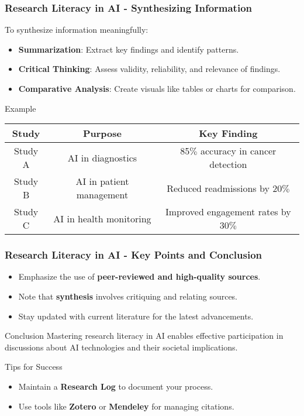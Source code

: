 \documentclass{beamer}
\begin{document}
\begin{frame}[fragile]
    \frametitle{Research Literacy in AI - Synthesizing Information}
    To synthesize information meaningfully:
    \begin{itemize}
        \item \textbf{Summarization}: Extract key findings and identify patterns.
        \item \textbf{Critical Thinking}: Assess validity, reliability, and relevance of findings.
        \item \textbf{Comparative Analysis}: Create visuals like tables or charts for comparison.
    \end{itemize}
    \begin{block}{Example}
        \begin{tabular}{|c|c|c|}
            \hline
            \textbf{Study} & \textbf{Purpose} & \textbf{Key Finding} \\
            \hline
            Study A & AI in diagnostics & 85$\%$ accuracy in cancer detection \\
            Study B & AI in patient management & Reduced readmissions by 20$\%$ \\
            Study C & AI in health monitoring & Improved engagement rates by 30$\%$ \\
            \hline
        \end{tabular}
    \end{block}
\end{frame}

\begin{frame}[fragile]
    \frametitle{Research Literacy in AI - Key Points and Conclusion}
    \begin{itemize}
        \item Emphasize the use of \textbf{peer-reviewed and high-quality sources}.
        \item Note that \textbf{synthesis} involves critiquing and relating sources.
        \item Stay updated with current literature for the latest advancements.
    \end{itemize}
    \begin{block}{Conclusion}
        Mastering research literacy in AI enables effective participation in discussions about AI technologies and their societal implications.
    \end{block}
    \begin{block}{Tips for Success}
        \begin{itemize}
            \item Maintain a \textbf{Research Log} to document your process.
            \item Use tools like \textbf{Zotero} or \textbf{Mendeley} for managing citations.
        \end{itemize}
    \end{block}
\end{frame}
\end{document}
